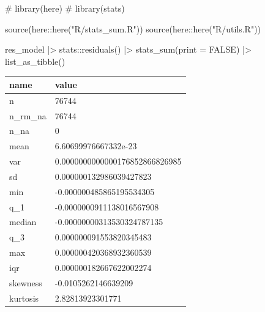 \documentclass[
  12pt,
  a4paper,
  oneside]{tesesusp}
\newenvironment{Shaded}{\begin{snugshade}}{\end{snugshade}}
\newcommand{\AttributeTok}[1]{\textcolor[rgb]{0.40,0.45,0.13}{#1}}
\newcommand{\CommentTok}[1]{\textcolor[rgb]{0.37,0.37,0.37}{#1}}
\newcommand{\ConstantTok}[1]{\textcolor[rgb]{0.56,0.35,0.01}{#1}}
\newcommand{\FunctionTok}[1]{\textcolor[rgb]{0.28,0.35,0.67}{#1}}
\newcommand{\NormalTok}[1]{\textcolor[rgb]{0.00,0.23,0.31}{#1}}
\newcommand{\SpecialCharTok}[1]{\textcolor[rgb]{0.37,0.37,0.37}{#1}}
\newcommand{\StringTok}[1]{\textcolor[rgb]{0.13,0.47,0.30}{#1}}
\begin{document}
\begin{Shaded}
\begin{Highlighting}[numbers=left,,]
\CommentTok{\# library(here)}
\CommentTok{\# library(stats)}

\FunctionTok{source}\NormalTok{(here}\SpecialCharTok{::}\FunctionTok{here}\NormalTok{(}\StringTok{"R/stats\_sum.R"}\NormalTok{))}
\FunctionTok{source}\NormalTok{(here}\SpecialCharTok{::}\FunctionTok{here}\NormalTok{(}\StringTok{"R/utils.R"}\NormalTok{))}

\NormalTok{res\_model }\SpecialCharTok{|\textgreater{}}
\NormalTok{  stats}\SpecialCharTok{::}\FunctionTok{residuals}\NormalTok{() }\SpecialCharTok{|\textgreater{}}
  \FunctionTok{stats\_sum}\NormalTok{(}\AttributeTok{print =} \ConstantTok{FALSE}\NormalTok{) }\SpecialCharTok{|\textgreater{}}
  \FunctionTok{list\_as\_tibble}\NormalTok{()}
\end{Highlighting}
\end{Shaded}

\begin{table}
\centering
\begin{tabular}{l|l}
\hline
name & value\\
\hline
n & 76744\\
\hline
n\_rm\_na & 76744\\
\hline
n\_na & 0\\
\hline
mean & 6.60699976667332e-23\\
\hline
var & 0.0000000000000176852866826985\\
\hline
sd & 0.000000132986039427823\\
\hline
min & -0.000000485865195534305\\
\hline
q\_1 & -0.0000000911138016567908\\
\hline
median & -0.00000000313530324787135\\
\hline
q\_3 & 0.000000091553820345483\\
\hline
max & 0.000000420368932360539\\
\hline
iqr & 0.000000182667622002274\\
\hline
skewness & -0.0105262146639209\\
\hline
kurtosis & 2.82813923301771\\
\hline
\end{tabular}
\end{table}
\end{document}
